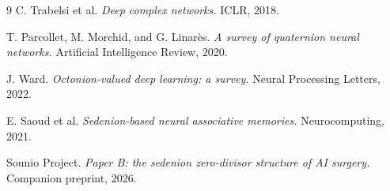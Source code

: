 \documentclass{article}
\begin{document}

\begin{thebibliography}{9}
C. Trabelsi et al.
\emph{Deep complex networks.}
ICLR, 2018.

T. Parcollet, M. Morchid, and G. Linarès.
\emph{A survey of quaternion neural networks.}
Artificial Intelligence Review, 2020.

J. Ward.
\emph{Octonion-valued deep learning: a survey.}
Neural Processing Letters, 2022.

E. Saoud et al.
\emph{Sedenion-based neural associative memories.}
Neurocomputing, 2021.

Sounio Project.
\emph{Paper B: the sedenion zero-divisor structure of AI surgery.}
Companion preprint, 2026.
\end{thebibliography}
\end{document}
